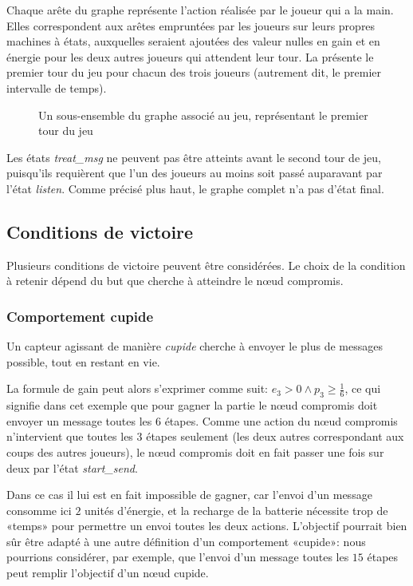 Chaque arête du graphe représente l'action réalisée par le joueur qui a la main.
Elles correspondent aux arêtes empruntées par les joueurs sur leurs propres machines à états, auxquelles seraient ajoutées des valeur nulles en gain et en énergie pour les deux autres joueurs qui attendent leur tour.
La  présente le premier tour du jeu pour chacun des trois joueurs (autrement dit, le premier intervalle de temps).
\begin{figure}[p]
    \vspace{-1cm}
    \centering
    
    \caption{Un sous-ensemble du graphe associé au jeu, représentant le premier tour du jeu}\label{tj:fig:autFirstTurn}
\end{figure}
Les états \emph{treat\_msg} ne peuvent pas être atteints avant le second tour de jeu, puisqu'ils requièrent que l'un des joueurs au moins soit passé auparavant par l'état \emph{listen}.
Comme précisé plus haut, le graphe complet n'a pas d'état final.

    \subsection{Conditions de victoire}

Plusieurs conditions de victoire peuvent être considérées.
Le choix de la condition à retenir dépend du but que cherche à atteindre le nœud compromis.

        \subsubsection{Comportement cupide}
Un capteur agissant de manière \emph{cupide} cherche à envoyer le plus de messages possible, tout en restant en vie.

La formule de gain peut alors s'exprimer comme suit: $e_3 > 0 \wedge p_3 \geq \frac16$, ce qui signifie dans cet exemple que pour gagner la partie le nœud compromis doit envoyer un message toutes les $6$ étapes.
Comme une action du nœud compromis n'intervient que toutes les $3$ étapes seulement (les deux autres correspondant aux coups des autres joueurs), le nœud compromis doit en fait passer une fois sur deux par l'état \emph{start\_send}.

Dans ce cas il lui est en fait impossible de gagner, car l'envoi d'un message consom\-me ici $2$ unités d'énergie, et la recharge de la batterie nécessite trop de «temps» pour permettre un envoi toutes les deux actions.
L'objectif pourrait bien sûr être adapté à une autre définition d'un comportement «cupide»: nous pourrions considérer, par exemple, que l'envoi d'un message toutes les $15$ étapes peut remplir l'objectif d'un nœud cupide.

